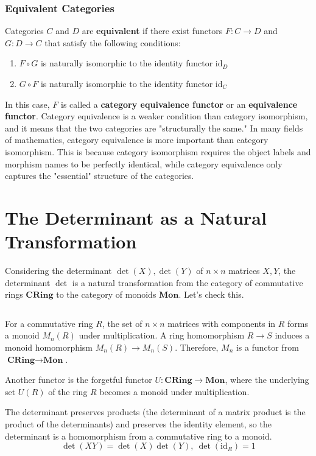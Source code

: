 \documentclass[uplatex,a4j,12pt,dvipdfmx]{jsarticle}
\begin{document}
\subsubsection{Equivalent Categories}
Categories $C$ and $D$ are \textbf{equivalent} if there exist functors $F: C \to D$ and $G: D \to C$ that satisfy the following conditions:
\begin{enumerate}
	\item $F \circ G$ is naturally isomorphic to the identity functor $\mathrm{id}_D$
	\item $G \circ F$ is naturally isomorphic to the identity functor $\mathrm{id}_C$
\end{enumerate}
In this case, $F$ is called a \textbf{category equivalence functor} or an \textbf{equivalence functor}.
Category equivalence is a weaker condition than category isomorphism, and it means that the two categories are "structurally the same." In many fields of mathematics, category equivalence is more important than category isomorphism. This is because category isomorphism requires the object labels and morphism names to be perfectly identical, while category equivalence only captures the "essential" structure of the categories.




\section{The Determinant as a Natural Transformation}

Considering the determinant $\det(X), \det(Y)$ of $n \times n$ matrices $X,Y$,
the determinant $\det$ is a natural transformation from the category of commutative rings $\textbf{CRing}$ to the category of monoids $\textbf{Mon}$.
Let's check this.

	${}$

For a commutative ring $R$, the set of $n \times n$ matrices with components in $R$ forms a monoid $M_{n}(R)$ under multiplication.
A ring homomorphism $R \to S$ induces a monoid homomorphism $M_{n} (R) \to M_{n} (S)$.
Therefore, $M_{n}$ is a functor from $\textbf{CRing} \to \textbf{Mon}$.

Another functor is the forgetful functor $U : \textbf{CRing} \to \textbf{Mon}$, where the underlying set $U(R)$ of the ring $R$ becomes a monoid under multiplication.

The determinant preserves products (the determinant of a matrix product is the product of the determinants) and preserves the identity element, so the determinant is a homomorphism from a commutative ring to a monoid.
$$\det(XY) = \det(X)\det(Y), \ \det(\text{id}_{R}) = 1$$
\end{document}
